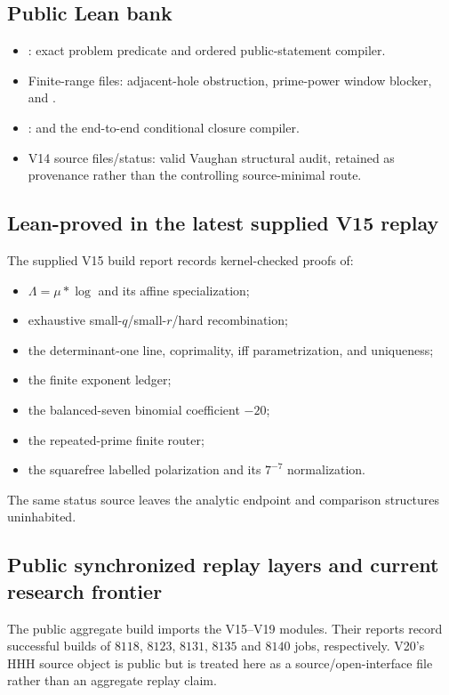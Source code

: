 \documentclass[11pt]{article}
\theoremstyle{definition}
\newcommand{\1}{\mathbf 1}
\begin{document}
\subsection*{Public Lean bank}
\begin{itemize}[leftmargin=1.6em,itemsep=0.4em]
\item {}: exact problem predicate and
  ordered public-statement compiler.
\item Finite-range files: adjacent-hole obstruction, prime-power window blocker, and
  .
\item {}:  and
  the end-to-end conditional closure compiler.
\item V14 source files/status: valid Vaughan structural audit, retained as provenance rather
  than the controlling source-minimal route.
\end{itemize}

\subsection*{Lean-proved in the latest supplied V15 replay}
The supplied V15 build report records kernel-checked proofs of:
\begin{itemize}[leftmargin=1.6em,itemsep=0.35em]
\item $\Lambda=\mu*\log$ and its affine specialization;
\item exhaustive small-$q$/small-$r$/hard recombination;
\item the determinant-one line, coprimality, iff parametrization, and uniqueness;
\item the finite exponent ledger;
\item the balanced-seven binomial coefficient $-20$;
\item the repeated-prime finite router;
\item the squarefree labelled polarization and its $7^{-7}$ normalization.
\end{itemize}
The same status source leaves the analytic endpoint and comparison structures uninhabited.

\subsection*{Public synchronized replay layers and current research frontier}
The public aggregate build imports the V15--V19 modules.  Their reports record successful
builds of $8118$, $8123$, $8131$, $8135$ and $8140$ jobs, respectively.  V20's HHH source
object is public but is treated here as a source/open-interface file rather than an
aggregate replay claim.
\end{document}
